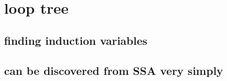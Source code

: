 \chapter{loop tree}


\section{finding induction variables}
\section{can be discovered from SSA very simply}

